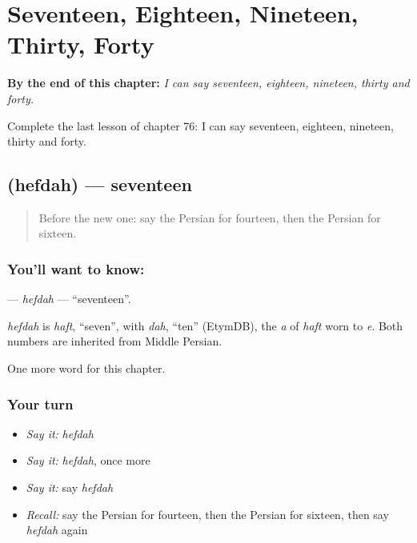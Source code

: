 
\chapter{Seventeen, Eighteen, Nineteen, Thirty, Forty}
\label{ch:fa-seventeen-eighteen-nineteen-thirty-forty}

\begin{chapteropening}
\textbf{By the end of this chapter:} \emph{I can say seventeen, eighteen, nineteen, thirty and forty.}

Complete the last lesson of chapter 76: I can say seventeen, eighteen, nineteen, thirty and forty.
\end{chapteropening}

\section[\texorpdfstring{\fa{هفده} (hefdah)}{هفده (hefdah)}]{ (hefdah) — seventeen}

\label{lesson:FA-C76-hefdah}



\begin{quote}
Before the new one: say the Persian for fourteen, then the Persian for sixteen.
\end{quote}

\subsection*{You'll want to know: }
\textbf{} — \emph{hefdah} — \textquotedblleft{}seventeen\textquotedblright{}.

\begin{cousinweb}
\emph{hefdah} is \emph{haft}, \textquotedblleft{}seven\textquotedblright{}, with \emph{dah}, \textquotedblleft{}ten\textquotedblright{} (EtymDB), the \emph{a} of \emph{haft} worn to \emph{e}. Both numbers are inherited from Middle Persian.
\end{cousinweb}

\begin{grammarlens}[title={What you've built}]
One more word for this chapter.
\end{grammarlens}

\subsection*{Your turn}
\begin{itemize}
\raggedright
  \item \emph{Say it:} \emph{hefdah}
  \item \emph{Say it:} \emph{hefdah}, once more
  \item \emph{Say it:} say \emph{hefdah}
  \item \emph{Recall:} say the Persian for fourteen, then the Persian for sixteen, then say \emph{hefdah} again
\end{itemize}

